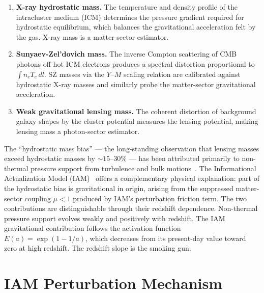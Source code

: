 \documentclass[12pt,a4paper]{article}
\begin{document}
\begin{enumerate}
\item \textbf{X-ray hydrostatic mass.} The temperature and density profile of the
intracluster medium (ICM) determines the pressure gradient required for hydrostatic
equilibrium, which balances the gravitational acceleration felt by the gas. X-ray
mass is a matter-sector estimator.

\item \textbf{Sunyaev-Zel'dovich mass.} The inverse Compton scattering of CMB
photons off hot ICM electrons produces a spectral distortion proportional to
$\int n_e T_e\, dl$. SZ masses via the $Y$--$M$ scaling relation are calibrated
against hydrostatic X-ray masses and similarly probe the matter-sector gravitational
acceleration.

\item \textbf{Weak gravitational lensing mass.} The coherent distortion of
background galaxy shapes by the cluster potential measures the lensing potential,
making lensing mass a photon-sector estimator.
\end{enumerate}

The ``hydrostatic mass bias'' --- the long-standing observation that lensing masses
exceed hydrostatic masses by $\sim 15$--$30\%$ --- has been attributed primarily to
non-thermal pressure support from turbulence and bulk motions~\citep{Nagai2007,
Nelson2014}. The Informational Actualization Model (IAM)~\citep{Mahaffey2026a}
offers a complementary physical explanation: part of the hydrostatic bias is
gravitational in origin, arising from the suppressed matter-sector coupling
$\mu < 1$ produced by IAM's perturbation friction term. The two contributions are
distinguishable through their redshift dependence. Non-thermal pressure support
evolves weakly and positively with redshift. The IAM gravitational contribution
follows the activation function $E(a) = \exp(1 - 1/a)$, which decreases from its
present-day value toward zero at high redshift. The redshift slope is the smoking
gun.

\section{IAM Perturbation Mechanism}
\end{document}
